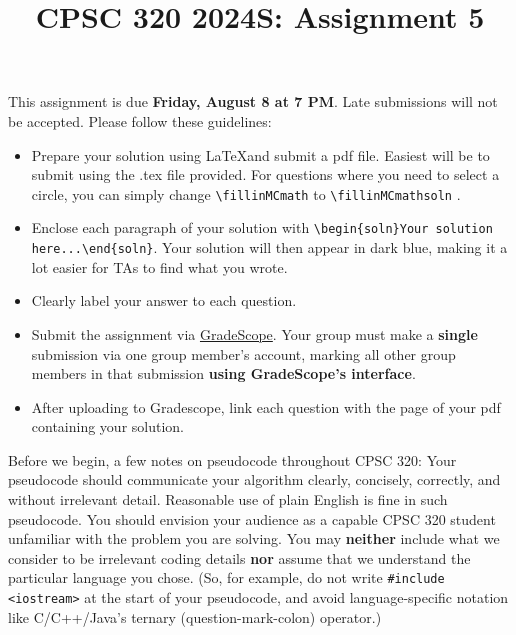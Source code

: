 \documentclass[11pt,fleqn]{exam}
\author{}
\date{}
\title{CPSC 320 2024S: Assignment 5}
\newcommand{\fillinMCmath}[1]{\begin{tikzpicture}\draw circle [radius=0.5em];\end{tikzpicture}\ #1}
\newcommand{\fillinMCmathsoln}[1]{\begin{tikzpicture}\draw[black, fill=blue] circle [radius=0.5em];\end{tikzpicture}\ #1}
\newenvironment{soln}{\color{solnblue}}{}
\begin{document}
\maketitle
\vspace{-0.5in} This assignment is due \textbf{Friday, August 8 at 7 PM}. Late submissions will not be accepted. Please follow these guidelines:
\begin{itemize}
	\item Prepare your  solution using \LaTeX and submit  a pdf file. Easiest will be to submit using
	      the .tex file provided. For questions where you  need to select a circle, you can simply
	      change \verb~\fillinMCmath~ to \verb~\fillinMCmathsoln~ .

	\item Enclose each paragraph of your solution with
	      \verb~\begin{soln}Your solution here...\end{soln}~.
	      \begin{soln}Your  solution will  then appear  in dark  blue\end{soln}, making  it a  lot
	      easier for TAs to find what you wrote.

	\item Clearly label your answer to each question.

	\item   Submit   the    assignment   via   \href{https://gradescope.ca/}{GradeScope}. Your group must make  a \textbf{single} submission via one
	      group member's account, marking all other group members in that submission \textbf{using
		      GradeScope's interface}.

	\item  After uploading  to  Gradescope, link  each  question  with the  page  of your  pdf
	      containing your solution.
\end{itemize}

Before we  begin, a few  notes on pseudocode throughout  CPSC 320: Your  pseudocode should
communicate your algorithm  clearly, concisely, correctly, and  without irrelevant detail.
Reasonable use  of plain  English is  fine in  such pseudocode.  You should  envision your
audience as a capable CPSC 320 student unfamiliar with the problem you are solving. You may \textbf{neither} include what we consider to be irrelevant coding details \textbf{nor} assume that  we understand the particular  language you
chose. (So, for example,  do not write \texttt{\#include <iostream>} at  the start of your
pseudocode,   and    avoid   language-specific   notation   like    C/C++/Java's   ternary
(question-mark-colon) operator.)
\end{document}
